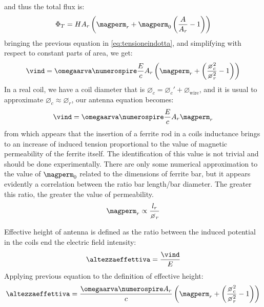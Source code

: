and thus the total flux is:
\begin{equation}
\Phi_T = H A_r \braces{ \magperm_r + \magperm_0 \braces{ \dfrac{A}{A_r} - 1} }
\end{equation}
bringing the previous equation in \ref{eq:tensioneindotta}, and simplifying with respect to constant parts of area, we get:
\begin{equation}
\vind = \omegaarva \numerospire \dfrac{E}{c} A_r \braces{\magperm_r + \braces{\dfrac{\diameter_c^2}{\diameter_r^2}-1}}
\end{equation}
In a real coil, we have a coil diameter that is ${\diameter_c = \diameter_c' + \diameter_\mathrm{wire}}$, and it is usual to approximate ${\diameter_c \approx \diameter_r}$, our antenna equation becomes:
\begin{equation}
\vind = \omegaarva \numerospire \dfrac{E}{c} A_r \magperm_r
\end{equation}
from which appears that the insertion of a ferrite rod in a coils inductance brings to an increase of induced tension proportional to the value of magnetic permeability of the ferrite itself\citep{laurent1962ferrite}. The identification of this value is not trivial and should be done experimentally. There are only some numerical approximation to the value of $\magperm_0$ related to the dimensions of ferrite bar, but it appears evidently a correlation between the ratio bar length/bar diameter. The greater this ratio, the greater the value of permeability. 
\begin{equation}
\magperm_r \propto \dfrac{l_r}{\diameter_r}
\end{equation}

Effective height of antenna is defined as the ratio between the induced potential in the coils end the electric field intensity:
\begin{equation}
\altezzaeffettiva = \dfrac{\vind}{E}
\end{equation}
Applying previous equation to the definition of effective height:
\begin{equation}
\altezzaeffettiva = \dfrac{\omegaarva \numerospire A_r}{c} \braces{\magperm_r + \braces{\dfrac{\diameter_c^2}{\diameter_r^2}-1}}
\end{equation}

